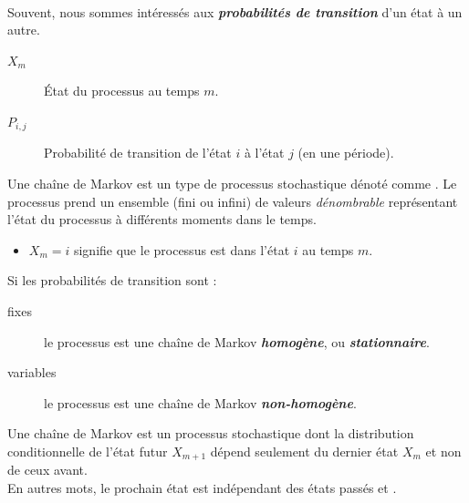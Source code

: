 \documentclass[10pt, french]{article}
\begin{document}
\begin{multicols*}{2}
\begin{rappel_enhanced}[Contexte]
\

Souvent, nous sommes intéressés aux \textit{\textbf{probabilités de transition}} d'un état à un autre. 
\end{rappel_enhanced}

\begin{distributions}[Notation]
\begin{description}
	\item[$X_{m}$]	État du processus au temps $m$.
	\item[$P_{i, j}$]	Probabilité de transition de l'état $i$ à l'état $j$ (en une période).
\end{description}
\end{distributions}

\begin{definitionNOHFILL}
Une chaîne de Markov est un type de processus stochastique dénoté comme . Le processus prend un ensemble (fini ou infini) de valeurs \textit{dénombrable} représentant l'état du processus à différents moments dans le temps.
\begin{itemize}
	\item	$X_{m} = i$ signifie que le processus est dans l'état $i$ au temps $m$.
\end{itemize}
\end{definitionNOHFILL}

\begin{definitionNOHFILLsub}
Si les probabilités de transition sont :
\begin{description}
	\item[fixes]	le processus est une chaîne de Markov \textbf{\textit{homogène}}, ou \textbf{\textit{stationnaire}}.
	\item[variables]	le processus est une chaîne de Markov \textbf{\textit{non-homogène}}.
\end{description}
\end{definitionNOHFILLsub}

\begin{definitionNOHFILLsub}
Une chaîne de Markov est un processus stochastique dont la distribution conditionnelle de l'état futur $X_{m + 1}$ dépend seulement du dernier état $X_{m}$ et non de ceux avant. \\

En autres mots, le prochain état est indépendant des états passés et .
\end{definitionNOHFILLsub}


\end{multicols*}
\end{document}
